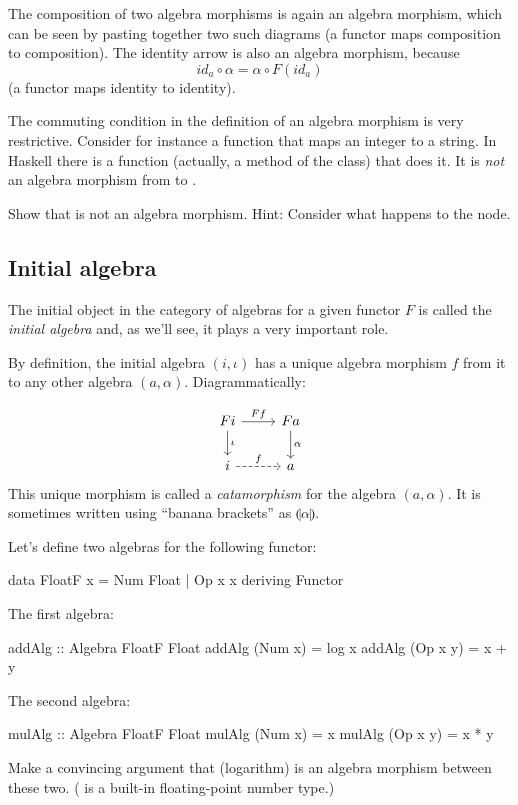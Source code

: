 \documentclass[DaoFP]{subfiles}
\begin{document}
The composition of two algebra morphisms is again an algebra morphism, which can be seen by pasting together two such diagrams (a functor maps composition to composition). The identity arrow is also an algebra morphism, because 
\[ id_a \circ \alpha = \alpha \circ F (id_a) \]
(a functor maps identity to identity).

The commuting condition in the definition of an algebra morphism is very restrictive. Consider for instance a function that maps an integer to a string. In Haskell there is a  function (actually, a method of the  class) that does it. It is \emph{not} an algebra morphism from  to . 

\begin{exercise}
Show that  is not an algebra morphism. Hint: Consider what happens to the  node.
\end{exercise}

\subsection{Initial algebra}

The initial object in the category of algebras for a given functor $F$ is called the \emph{initial algebra} and, as we'll see, it plays a very important role.

By definition, the initial algebra $(i, \iota)$ has a unique algebra morphism $f$ from it to any other algebra $(a, \alpha)$. Diagrammatically:

\[
 \begin{tikzcd}
 F i 
 \arrow[r, "F f"]
 \arrow[d, "\iota"]
 & F a
\arrow[d, "\alpha"]
 \\
 i
 \arrow[r, dashed, "f"]
 & a
  \end{tikzcd}
\]
 This unique morphism is called a \emph{catamorphism} for the algebra $(a, \alpha)$. It is sometimes written using \index{$\llparenthesis \rrparenthesis$}``banana brackets'' as $\llparenthesis \alpha \rrparenthesis$.


\begin{exercise}
Let's define two algebras for the following functor:
\begin{haskell}
data FloatF x = Num Float | Op x x
    deriving Functor
\end{haskell}
The first algebra:
\begin{haskell}
addAlg :: Algebra FloatF Float
addAlg (Num x) = log x
addAlg (Op x y) = x + y
\end{haskell}
The second algebra:
\begin{haskell}
mulAlg :: Algebra FloatF Float
mulAlg (Num x) = x
mulAlg (Op x y) = x * y
\end{haskell}
Make a convincing argument that  (logarithm) is an algebra morphism between these two. ( is a built-in floating-point number type.)
\end{exercise}
\end{document}
